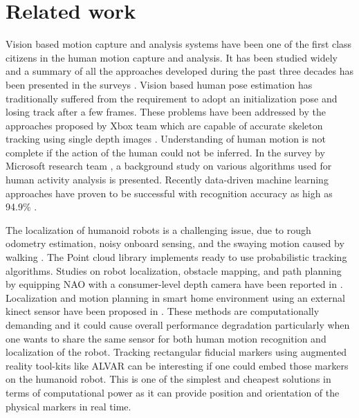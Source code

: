 \documentclass{llncs}
\begin{document}
\section{Related work}
	Vision based motion capture and analysis systems have been one of the first class citizens in the human motion capture and analysis. It has been studied widely and a summary of all the approaches developed during the past three decades has been presented in the surveys \cite{moeslund2006survey}\cite{poppe2007vision}. Vision based human pose estimation has traditionally suffered from the requirement to adopt an initialization pose and losing track after a few frames. These problems have been addressed by the approaches proposed by Xbox \cite{Kinect2014} team which are capable of accurate skeleton tracking using single depth images \cite{shotton2013efficient}. Understanding of human motion is not complete if the action of the human could not be inferred. In the survey by Microsoft research team \cite{han2013enhanced}, a background study on various algorithms used for human activity analysis is presented. Recently data-driven machine learning approaches have proven to be successful with recognition accuracy as high as 94.9\% \cite{Kinect2014}.
	
	The localization of humanoid robots is a challenging issue, due to rough odometry estimation, noisy onboard sensing, and the swaying motion caused by walking \cite{cervera2012localization}. The Point cloud library \cite{rusu20113d} implements ready to use probabilistic tracking algorithms. Studies on robot localization, obstacle mapping, and path planning by equipping NAO with a consumer-level depth camera have been reported in \cite{maier2012real}. Localization and motion planning in smart home environment using an external kinect sensor have been proposed in \cite{cervera2012localization}. These methods are computationally demanding and it could cause overall performance degradation particularly when one wants to share the same sensor for both human motion recognition and localization of the robot. Tracking rectangular fiducial markers using augmented reality tool-kits like ALVAR \cite{ALVAR} can be interesting if one could embed those markers on the humanoid robot. This is one of the simplest and cheapest solutions in terms of computational power as it can provide position and orientation of the physical markers in real time.
	
\end{document}
